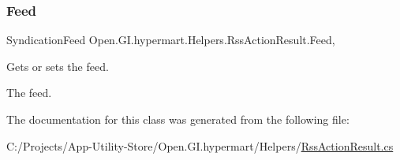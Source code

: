 \subsubsection{\texorpdfstring{Feed}{Feed}}
{\footnotesize\ttfamily Syndication\+Feed Open.\+G\+I.\+hypermart.\+Helpers.\+Rss\+Action\+Result.\+Feed\hspace{0.3cm}{\ttfamily [get]}, {\ttfamily [set]}}



Gets or sets the feed. 

The feed. 

The documentation for this class was generated from the following file\+:\begin{DoxyCompactItemize}
\item 
C\+:/\+Projects/\+App-\/\+Utility-\/\+Store/\+Open.\+G\+I.\+hypermart/\+Helpers/\hyperlink{_rss_action_result_8cs}{Rss\+Action\+Result.\+cs}\end{DoxyCompactItemize}

